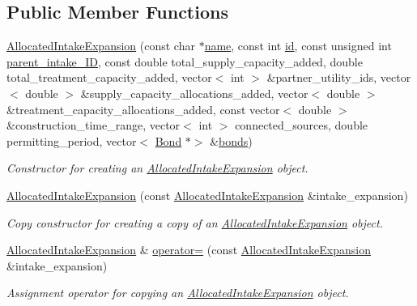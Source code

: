 \subsection*{Public Member Functions}
\begin{DoxyCompactItemize}
\item 
\mbox{\hyperlink{classAllocatedIntakeExpansion_a4ed3330e33441d67d3b0c8bbb243d6c2}{Allocated\+Intake\+Expansion}} (const char $\ast$\mbox{\hyperlink{classWaterSource_a846ea74c5b453d014f594d41fee8c765}{name}}, const int \mbox{\hyperlink{classWaterSource_a6eafe5dfefd317877d1244e8a7c6e742}{id}}, const unsigned int \mbox{\hyperlink{classAllocatedIntakeExpansion_a725ce7276ef9158da9fa7e2b1e217b14}{parent\+\_\+intake\+\_\+\+ID}}, const double total\+\_\+supply\+\_\+capacity\+\_\+added, double total\+\_\+treatment\+\_\+capacity\+\_\+added, vector$<$ int $>$ \&partner\+\_\+utility\+\_\+ids, vector$<$ double $>$ \&supply\+\_\+capacity\+\_\+allocations\+\_\+added, vector$<$ double $>$ \&treatment\+\_\+capacity\+\_\+allocations\+\_\+added, const vector$<$ double $>$ \&construction\+\_\+time\+\_\+range, vector$<$ int $>$ connected\+\_\+sources, double permitting\+\_\+period, vector$<$ \mbox{\hyperlink{classBond}{Bond}} $\ast$$>$ \&\mbox{\hyperlink{classWaterSource_a413b094e11bdce62f4d82e5bb9e4706e}{bonds}})
\begin{DoxyCompactList}\small\item\em Constructor for creating an {\ttfamily \mbox{\hyperlink{classAllocatedIntakeExpansion}{Allocated\+Intake\+Expansion}}} object. \end{DoxyCompactList}\item 
\mbox{\hyperlink{classAllocatedIntakeExpansion_a5789688f1a053b4f3201470aedece0cc}{Allocated\+Intake\+Expansion}} (const \mbox{\hyperlink{classAllocatedIntakeExpansion}{Allocated\+Intake\+Expansion}} \&intake\+\_\+expansion)
\begin{DoxyCompactList}\small\item\em Copy constructor for creating a copy of an {\ttfamily \mbox{\hyperlink{classAllocatedIntakeExpansion}{Allocated\+Intake\+Expansion}}} object. \end{DoxyCompactList}\item 
\mbox{\hyperlink{classAllocatedIntakeExpansion}{Allocated\+Intake\+Expansion}} \& \mbox{\hyperlink{classAllocatedIntakeExpansion_a3c695346b66343278a51c3df50866acb}{operator=}} (const \mbox{\hyperlink{classAllocatedIntakeExpansion}{Allocated\+Intake\+Expansion}} \&intake\+\_\+expansion)
\begin{DoxyCompactList}\small\item\em Assignment operator for copying an {\ttfamily \mbox{\hyperlink{classAllocatedIntakeExpansion}{Allocated\+Intake\+Expansion}}} object. \end{DoxyCompactList}\item 
$$
\end{DoxyCompactItemize}

